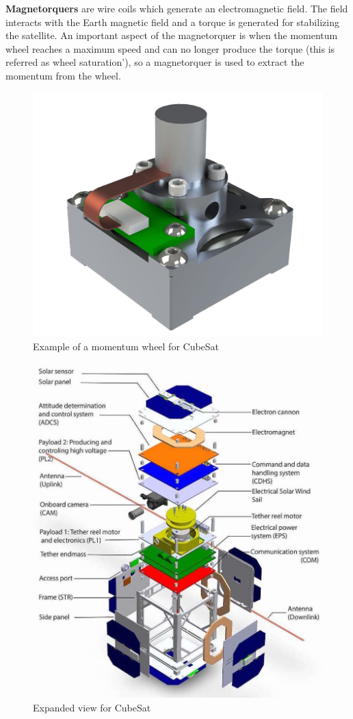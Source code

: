 \textbf{Magnetorquers} are wire coils which generate an electromagnetic field. The field interacts with the Earth magnetic field and a torque is generated for stabilizing the satellite. An important aspect of the magnetorquer is when the momentum wheel reaches a maximum speed and can no longer produce the torque (this is referred as wheel saturation'), so a magnetorquer is used to extract the momentum from the wheel.
%
\begin{table}[H]
	\begin{minipage}[b]{0.49\linewidth}
		\centering
		\begin{figure}[H]
			\centering
			\includegraphics[width=0.5\linewidth]{figures/MW}
			\caption{Example of a momentum wheel for CubeSat}
			\label{fig:MW}
		\end{figure}
	\end{minipage}\hfill
	\begin{minipage}[b]{0.49\linewidth}
		\centering
		\begin{figure}[H]
			\centering
			\includegraphics[width=1\linewidth]{figures/cubsat}
			\caption{Expanded view for CubeSat}
			\label{fig:cub}
		\end{figure}
	\end{minipage}
\end{table}
